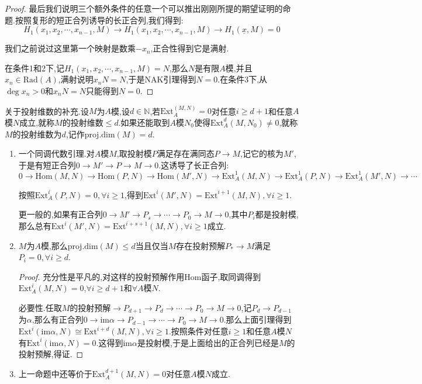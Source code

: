 \begin{enumerate}
\begin{proof}
		最后我们说明三个额外条件的任意一个可以推出刚刚所提的期望证明的命题.按照复形的短正合列诱导的长正合列,我们得到:
		$$H_1(x_1,x_2,\cdots,x_{n-1},M)\to H_1(x_1,x_2,\cdots,x_{n-1},M)\to H_1(\underline{x},M)=0$$
		
		我们之前说过这里第一个映射是数乘$-x_n$,正合性得到它是满射.
		
	    在条件1和2下,记$H_1(x_1,x_2,\cdots,x_{n-1},M)=N$,那么$N$是有限$A$模,并且$x_n\in\mathrm{Rad}(A)$,满射说明$x_nN=N$,于是NAK引理得到$N=0$.在条件3下,从$\deg x_n>0$和$x_nN=N$只能得到$N=0$.
	\end{proof}
\end{enumerate}

关于投射维数的补充.设$M$为$A$模,设$d\in\mathbb{N}$,若$\mathrm{Ext}_A^(M,N)=0$对任意$i\ge d+1$和任意$A$模$N$成立,就称$M$的投射维数$\le d$.如果还能取到$A$模$N_0$使得$\mathrm{Ext}_A^d(M,N_0)\not=0$,就称$M$的投射维数为$d$,记作$\mathrm{proj.dim}(M)=d$.
\begin{enumerate}
	\item 一个同调代数引理.对$A$模$M$,取投射模$P$满足存在满同态$P\to M$,记它的核为$M'$,于是有短正合列$0\to M'\to P\to M\to0$.这诱导了长正合列:
	$$0\to\mathrm{Hom}(M,N)\to\mathrm{Hom}(P,N)\to\mathrm{Hom}(M',N)\to\mathrm{Ext}_A^1(M,N)\to\mathrm{Ext}_A^1(P,N)\to\mathrm{Ext}_A^1(M',N)\to\cdots$$
	
	按照$\mathrm{Ext}_A^i(P,N)=0,\forall i\ge1$,得到$\mathrm{Ext}^i(M',N)=\mathrm{Ext}^{i+1}(M,N),\forall i\ge1$.
	
	更一般的,如果有正合列$0\to M'\to P_s\to\cdots\to P_0\to M\to0$,其中$P_i$都是投射模,那么总有$\mathrm{Ext}^i(M',N)=\mathrm{Ext}^{i+s+1}(M,N),\forall i\ge1$成立.
	\item $M$为$A$模,那么$\mathrm{proj.dim}(M)\le d$当且仅当$M$存在投射预解$P_*\to M$满足$P_i=0,\forall i\ge d$.
	\begin{proof}
		
		充分性是平凡的,对这样的投射预解作用$\mathrm{Hom}$函子,取同调得到$\mathrm{Ext}_A^i(M,N)=0$,$\forall i\ge d+1$和$\forall A$模$N$.
		
		必要性.任取$M$的投射预解$\to P_{d+1}\to P_d\to\cdots\to P_0\to M\to0$,记$P_d\to P_{d-1}$为$\alpha$,那么有正合列$0\to\mathrm{im}\alpha\to P_{d-1}\to\cdots\to P_0\to M\to0$.那么上面引理得到$\mathrm{Ext}^i(\mathrm{im}\alpha,N)\cong\mathrm{Ext}^{i+d}(M,N),\forall i\ge1$.按照条件对任意$i\ge1$和任意$A$模$N$有$\mathrm{Ext}^i(\mathrm{im}\alpha,N)=0$.这得到$\mathrm{im}\alpha$是投射模,于是上面给出的正合列已经是$M$的投射预解,得证.
	\end{proof}
	\item 上一命题中还等价于$\mathrm{Ext}^{d+1}_A(M,N)=0$对任意$A$模$N$成立.
\end{enumerate}

